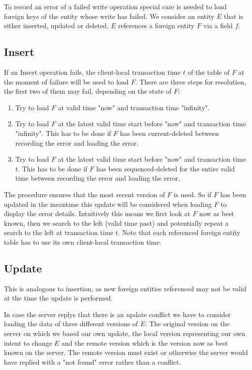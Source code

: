 \documentclass{memoir}
\begin{document}
To record an error of a failed write operation special care is needed to load foreign keys of the entity
whose write has failed. We consider an entity $E$ that is either inserted, updated or deleted. $E$ references
a foreign entity $F$ via a field $f$.

\subsection{Insert}

If an Insert operation fails, the client-local transaction time $t$ of the table of $F$ at the moment of failure will be used to load $F$. There are three steps for resolution, the first two of them may fail, depending on the state of $F$:

\begin{enumerate}
	\item Try to load $F$ at valid time "now" and transaction time "infinity".
	\item Try to load $F$ at the latest valid time start before "now" and transaction time "infinity". This has to be done if $F$ has been current-deleted between recording the error and loading the error.
	\item Try to load $F$ at the latest valid time start before "now" and transaction time $t$. This has to be done if $F$ has been sequenced-deleted for the entire valid time between recording the error and loading the error.
\end{enumerate}

The procedure ensures that the most recent version of $F$ is used. So if $F$ has been updated in the meantime this update will be considered when loading $F$ to display the error details. Intuitively this means we first look at $F$ now as best known, then we search to the left (valid time past) and potentially repeat a search to the left at transaction time $t$. Note that each referenced foreign entity table has to use its own client-local transaction time.

\subsection{Update}

This is analogous to insertion, as new foreign entities referenced may not be valid at the time the update is performed.

In case the server replys that there is an update conflict we have to consider loading the data of three different versions of $E$: The original version on the server on which we based our own update, the local version representing our own intent to change $E$ and the remote version which is the version now as best known on the server. The remote version must exist or otherwise the server would have replied with a "not found" error rather than a conflict.
\end{document}
